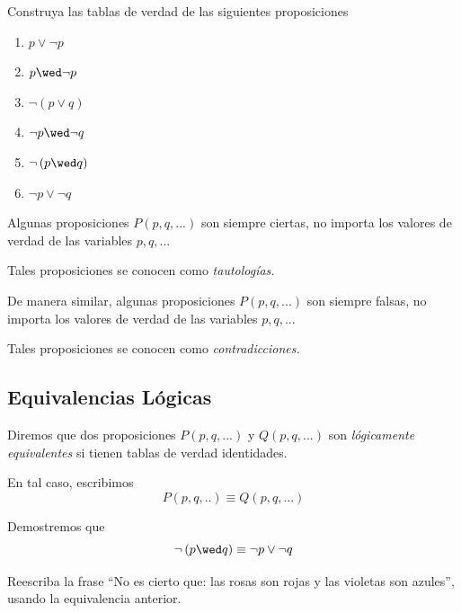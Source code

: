 \begin{ejemplo} Construya las tablas de verdad de las siguientes proposiciones
\begin{enumerate}
 \item $p\vee \neg p$
 \item $p\wed \neg p$
 \item $\neg\left( p \vee q \right)$
 \item $\neg p \wed \neg q$
 \item $\neg\left( p \wed q \right)$
 \item $\neg p \vee \neg q$
\end{enumerate}


\end{ejemplo}


 Algunas proposiciones $P(p,q,...)$ son siempre ciertas, no importa los valores de verdad de las variables $p,q,...$ 
  
 
 Tales proposiciones se conocen como \emph{tautologías.}



 De manera similar, algunas proposiciones $P(p,q,...)$ son siempre falsas, no importa los valores de verdad de las variables $p,q,...$ 
  
 
 Tales proposiciones se conocen como \emph{contradicciones.}






\subsection{Equivalencias Lógicas}


 Diremos que dos proposiciones $P(p,q,...)$ y $Q(p,q,...)$ son \emph{lógicamente equivalentes} si tienen tablas de verdad identidades. 
 
 
 En tal caso, escribimos $$P(p,q,..)\equiv Q(p,q,...)$$



 \begin{ejemplo} Demostremos que 
  $$
  \neg\left( p \wed q \right) \equiv \neg p \vee \neg q
  $$
 \end{ejemplo}




 \begin{ejemplo}
  Reescriba la frase ``No es cierto que: las rosas son rojas y las violetas son azules'', usando la equivalencia anterior.
 \end{ejemplo}



